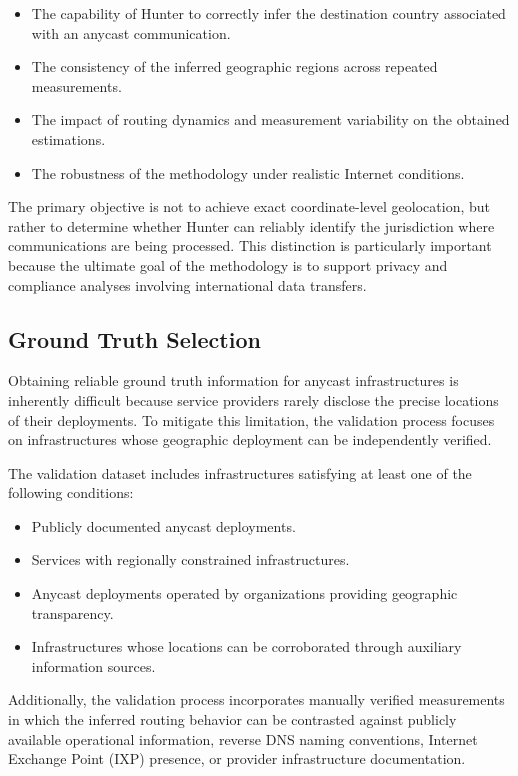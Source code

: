 \begin{itemize}
    \item The capability of Hunter to correctly infer the destination country associated with an anycast communication.
    \item The consistency of the inferred geographic regions across repeated measurements.
    \item The impact of routing dynamics and measurement variability on the obtained estimations.
    \item The robustness of the methodology under realistic Internet conditions.
\end{itemize}

The primary objective is not to achieve exact coordinate-level geolocation, but rather to determine whether Hunter can reliably identify the jurisdiction where communications are being processed. This distinction is particularly important because the ultimate goal of the methodology is to support privacy and compliance analyses involving international data transfers.

\subsection{Ground Truth Selection}

Obtaining reliable ground truth information for anycast infrastructures is inherently difficult because service providers rarely disclose the precise locations of their deployments. To mitigate this limitation, the validation process focuses on infrastructures whose geographic deployment can be independently verified.

The validation dataset includes infrastructures satisfying at least one of the following conditions:

\begin{itemize}
    \item Publicly documented anycast deployments.
    \item Services with regionally constrained infrastructures.
    \item Anycast deployments operated by organizations providing geographic transparency.
    \item Infrastructures whose locations can be corroborated through auxiliary information sources.
\end{itemize}

Additionally, the validation process incorporates manually verified measurements in which the inferred routing behavior can be contrasted against publicly available operational information, reverse DNS naming conventions, Internet Exchange Point (IXP) presence, or provider infrastructure documentation.


